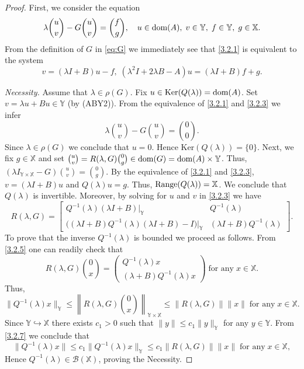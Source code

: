\documentclass[11pt]{amsart}
\numberwithin{equation}{section}
\newcommand{\Ker}{{\mathrm{Ker}}}
\newcommand{\Range}{{\rm Range }}
\theoremstyle{remark}
\theoremstyle{definition}
\newcommand\bX{{\mathbb X}}
\newcommand\bY{{\mathbb Y}}
\newcommand{\dom}{\text{\rm{dom}}}
\begin{document}
\begin{proof} First, we consider the equation
	\begin{equation}\label{3.2.1}
		\lambda \binom{u}{v} - G\binom{u}{v} = \binom{f}{g},
		\quad u \in \dom(A),\; v \in \bY,\; f \in \bY,\; g \in \bX.
	\end{equation}
	From the definition of $G$ in \eqref{eq:G} we immediately see that \eqref{3.2.1} is equivalent to the system
	\begin{equation}\label{3.2.3}
		v = (\lambda I + B)u - f,\; (\lambda^2 I+ 2\lambda B - A)u = (\lambda I+B)f + g. 
	\end{equation}
	
	\noindent\textit{Necessity.}
	Assume that $\lambda \in \rho(G)$.
	Fix $u \in \Ker(Q(\lambda))=\dom(A)$. 
	Set $v = \lambda u + Bu \in\bY$ (by (ABY2)).
	From the equivalence of \eqref{3.2.1} and \eqref{3.2.3} we infer
	\begin{equation}\label{l3.2.4}
		\lambda \binom{u}{v} - G\binom{u}{v} = \binom{0}{0}.
	\end{equation}
	Since $\lambda\in\rho(G)$ we conclude that $u=0$. Hence $\Ker(Q(\lambda)) = \{0\}$.
	Next, we fix $g \in\bX$ and set $\binom{u}{v} = R(\lambda, G)\binom{0}{g}\in\dom(G)=\dom(A)\times\bY$. Thus, $(\lambda I_{\bY\times\bX}-G)\binom{u}{v}=\binom{0}{g}$. By the equivalence of \eqref{3.2.1} and \eqref{3.2.3}, 
	$v = (\lambda I+B)u$ and  $Q(\lambda)u = g$. Thus, $\Range(Q(\lambda)) = \bX$.
	We conclude that $Q(\lambda)$ is invertible. Moreover, by solving for $u$ and $v$ in \eqref{3.2.3} we have
	\begin{equation}\label{3.2.5}
		R(\lambda, G) = \begin{bmatrix}
			Q^{-1}(\lambda)(\lambda I+B)|_\bY & Q^{-1}(\lambda) \\
			\bigl((\lambda I+B)Q^{-1}(\lambda)(\lambda I+B) - I\bigr)|_\bY & (\lambda I+B)Q^{-1}(\lambda)
		\end{bmatrix}.
	\end{equation}
	To prove that the inverse $Q^{-1}(\lambda)$ is bounded we proceed as follows. From \eqref{3.2.5} one can readily check that
	\begin{equation}\label{3.2.6}
		R(\lambda, G)\binom{0}{x} = \begin{pmatrix} Q^{-1}(\lambda)x \\ (\lambda+B)Q^{-1}(\lambda)x \end{pmatrix}
		\;\text{for any}\; x \in \bX.
	\end{equation}
	Thus,
	\begin{equation}\label{3.2.7}
		\|Q^{-1}(\lambda)x\|_\bY \leq \left\| R(\lambda,G)\binom{0}{x} \right\|_{\bY\times \bX}
		\leq \|R(\lambda,G)\| \|x\|\;\text{for any}\; x \in \bX.
	\end{equation}
	Since $\bY \hookrightarrow\bX$ there exists $c_1 > 0$ such that
	$\|y\| \leq c_1 \|y\|_\bY$ for any $y \in \bY$. From \eqref{3.2.7} we conclude that 
	\begin{equation}\label{3.2.8}
		\|Q^{-1}(\lambda)x\| \leq c_1 \|Q^{-1}(\lambda)x\|_\bY \leq c_1 \|R(\lambda,G)\| \|x\|\;\text{for any}\; x \in \bX,
	\end{equation}
	Hence $Q^{-1}(\lambda) \in \mathcal{B}(\bX)$, proving the Necessity. 
	

\end{proof}
\end{document}
